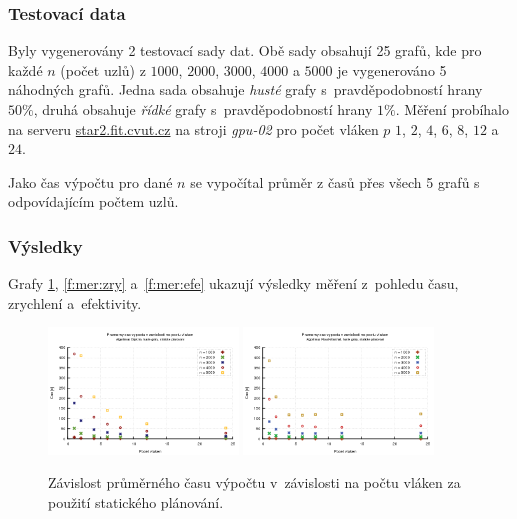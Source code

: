 \subsubsection{Testovací data}
Byly vygenerovány 2 testovací sady dat. Obě sady obsahují 25 grafů, kde pro každé $n$ (počet uzlů) z $1000$, $2000$, $3000$, $4000$ a $5000$ 
je vygenerováno 5 náhodných grafů. Jedna sada obsahuje \emph{husté} grafy s~pravděpodobností hrany $50 \%$, druhá obsahuje \emph{řídké} grafy
s~pravděpodobností hrany $1 \%$.
Měření probíhalo na serveru \url{star2.fit.cvut.cz} na stroji \textit{gpu-02} pro počet vláken $p$ $1$, $2$, $4$, $6$, $8$, $12$ a $24$.

Jako čas výpočtu pro dané $n$ se vypočítal průměr z časů přes všech 5 grafů s odpovídajícím počtem uzlů.

\subsubsection{Výsledky}
\label{l:vysledky}
Grafy \ref{f:mer:cas}, \ref{f:mer:zry} a~\ref{f:mer:efe} ukazují výsledky měření z~pohledu času, zrychlení a~efektivity.

\begin{figure}
    \centering
    \includegraphics[width=0.45\textwidth]{../grafy/02_openMP/02-01-Dijkstra_cas_v1}
    \includegraphics[width=0.45\textwidth]{../grafy/02_openMP/02-01-Floyd_cas_v1}
    \caption{Závislost průměrného času výpočtu v~závislosti na počtu vláken za použití statického plánování.}
    \label{f:mer:cas}
\end{figure}

